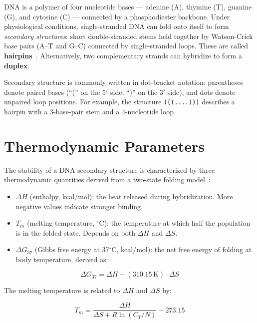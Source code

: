 \documentclass[12pt,oneside,letterpaper]{report}
\begin{document}
DNA is a polymer of four nucleotide bases --- adenine (A), thymine (T), guanine (G), and cytosine (C) --- connected by a phosphodiester backbone. Under physiological conditions, single-stranded DNA can fold onto itself to form \textit{secondary structures}: short double-stranded stems held together by Watson-Crick base pairs (A--T and G--C) connected by single-stranded loops. These are called \textbf{hairpins}~\cite{zuker2003}. Alternatively, two complementary strands can hybridize to form a \textbf{duplex}.

Secondary structure is commonly written in dot-bracket notation: parentheses denote paired bases (``('' on the 5$'$ side, ``)'' on the 3$'$ side), and dots denote unpaired loop positions. For example, the structure \texttt{(((....)))} describes a hairpin with a 3-base-pair stem and a 4-nucleotide loop.

\section{Thermodynamic Parameters}

The stability of a DNA secondary structure is characterized by three thermodynamic quantities derived from a two-state folding model~\cite{santalucia1998}:

\begin{itemize}
    \item $\Delta H$ (enthalpy, kcal/mol): the heat released during hybridization. More negative values indicate stronger binding.
    \item $T_m$ (melting temperature, $^\circ$C): the temperature at which half the population is in the folded state. Depends on both $\Delta H$ and $\Delta S$.
    \item $\Delta G_{37}$ (Gibbs free energy at 37$^\circ$C, kcal/mol): the net free energy of folding at body temperature, derived as:
\end{itemize}

\begin{equation}
    \Delta G_{37} = \Delta H - (310.15\,\text{K}) \cdot \Delta S
    \label{eq:gibbs}
\end{equation}

The melting temperature is related to $\Delta H$ and $\Delta S$ by:

\begin{equation}
    T_m = \frac{\Delta H}{\Delta S + R \ln(C_T / N)} - 273.15
    \label{eq:tm}
\end{equation}
\end{document}

